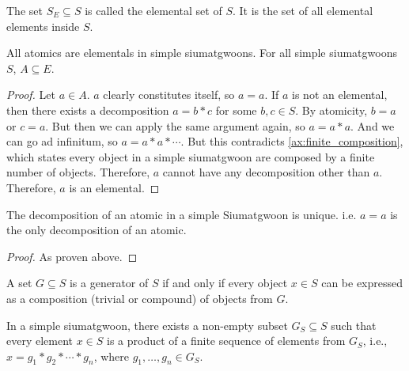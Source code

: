 \begin{definition}\label{def:elemental-set}
    The set $S_E \subseteq S$ is called the elemental set of $S$. It is the set of all elemental elements inside $S$.
\end{definition}


\begin{lemma}\label{def:atomics-are-elementals-in-simple-siumatgwoons}
    All atomics are elementals in simple siumatgwoons. For all simple siumatgwoons $S$, $A \subseteq E$.
\end{lemma}
\begin{proof}
    Let $a \in A$. $a$ clearly constitutes itself, so $a=a$. If $a$ is not an elemental, then there exists a decomposition $a=b*c$ for some $b,c \in S$. By atomicity, $b=a$ or $c=a$. But then we can apply the same argument again, so $a=a*a$. And we can go ad infinitum, so $a=a*a*\cdots$. But this contradicts \ref{ax:finite_composition}, which states every object in a simple siumatgwoon are composed by a finite number of objects. Therefore, $a$ cannot have any decomposition other than $a$. Therefore, $a$ is an elemental.
\end{proof}


\begin{lemma}[Atomics]\label{def:atomics}
    The decomposition of an atomic in a simple Siumatgwoon is unique. i.e. $a=a$ is the only decomposition of an atomic.
\end{lemma}
\begin{proof}
    As proven above.
\end{proof}



\begin{definition}[Generators]\label{def:generators}
    A set $G \subseteq S$ is a generator of $S$ if and only if every object $x \in S$ can be expressed as a composition (trivial or compound) of objects from $G$.
\end{definition}

\begin{theorem}\label{thm:generator-sets-exist-in-simple-siumatgwoons}
    In a simple siumatgwoon, there exists a non-empty subset $G_{S} \subseteq S$ such that every element $x \in S$ is a product of a finite sequence of elements from $G_S$, i.e., $x = g_1 * g_2 * \cdots * g_n$, where $g_1, \dots, g_n \in G_S$.
\end{theorem}

